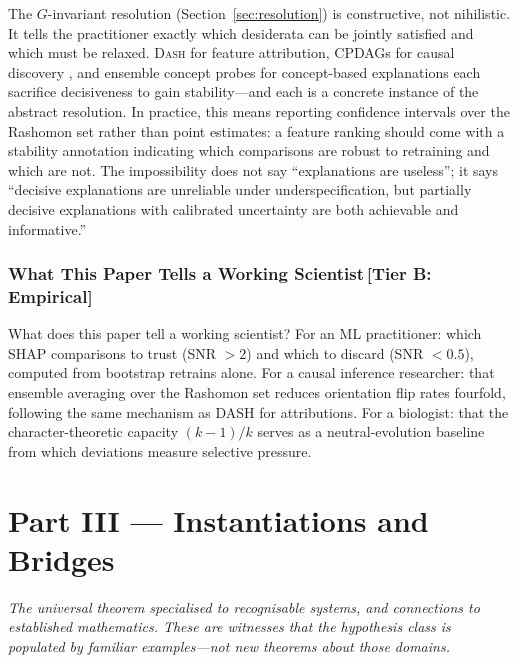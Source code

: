 \documentclass[11pt,a4paper]{article}
\newcommand{\DASH}{\textsc{Dash}}
\begin{document}
The $G$-invariant resolution (Section~\ref{sec:resolution}) is constructive, not
nihilistic.  It tells the practitioner exactly which desiderata can be jointly
satisfied and which must be relaxed.  \DASH{} for feature attribution, CPDAGs
for causal discovery \citep{verma1991equivalence}, and ensemble concept probes
for concept-based explanations \citep{kim2018tcav} each sacrifice decisiveness
to gain stability---and each is a concrete instance of the abstract resolution.
In practice, this means reporting confidence intervals over the Rashomon set
\citep{fisher2019models,semenova2022existence} rather than point estimates:
a feature ranking should come with a stability annotation indicating which
comparisons are robust to retraining and which are not.  The impossibility does
not say ``explanations are useless''; it says ``decisive explanations are
unreliable under underspecification, but partially decisive explanations with
calibrated uncertainty are both achievable and informative.''

\section{What This Paper Tells a Working Scientist\,\textnormal{\normalsize[Tier B: Empirical]}}
\label{sec:working-scientist}

What does this paper tell a working scientist?  For an ML practitioner: which SHAP comparisons to trust (SNR $> 2$) and which to discard (SNR $< 0.5$), computed from bootstrap retrains alone.  For a causal inference researcher: that ensemble averaging over the Rashomon set reduces orientation flip rates fourfold, following the same mechanism as DASH for attributions.  For a biologist: that the character-theoretic capacity $(k{-}1)/k$ serves as a neutral-evolution baseline from which deviations measure selective pressure.


\clearpage
\part{Part III \textnormal{\large --- Instantiations and Bridges}}
\noindent\emph{The universal theorem specialised to recognisable systems, and connections to established mathematics. These are witnesses that the hypothesis class is populated by familiar examples---not new theorems about those domains.}\par\medskip
\end{document}
